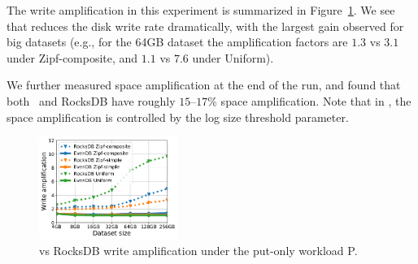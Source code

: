    
The write amplification in this experiment is summarized in 
Figure~\ref{fig:writeamp}. We see that \sys\/ reduces the disk write rate dramatically, 
with the largest gain observed for big datasets (e.g.,  for the 64GB dataset 
the amplification factors are $1.3$ vs $3.1$ under Zipf-composite, and $1.1$ vs $7.6$ under Uniform). 

We further measured space amplification at the end of the run, and found that both \sys\ and RocksDB have roughly $15$--$17\%$ 
space amplification. Note that in \sys, the space amplification is controlled by the log size threshold parameter.


\begin{figure}[t]
	\centering
	\includegraphics[width=0.4\textwidth]{figs/write_amp_p_line.pdf}
	\caption{{\sys\/ vs RocksDB write amplification under the put-only workload P.}}
	\label{fig:writeamp}
\end{figure}

